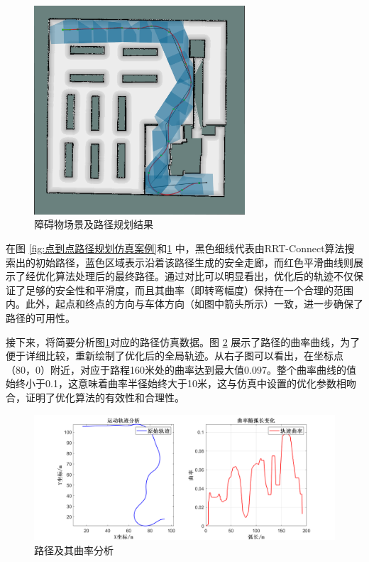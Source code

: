\documentclass[master,academic]{ysuthesis} %
\begin{document}
		\begin{figure}[H]
			\centering
			\includegraphics[width=0.7\textwidth]{single.png}
			\caption{障碍物场景及路径规划结果}
			\label{fig:single}
		\end{figure}
		
		在图 \ref{fig:点到点路径规划仿真案例}和\ref{fig:single} 中，黑色细线代表由RRT-Connect算法搜索出的初始路径，蓝色区域表示沿着该路径生成的安全走廊，而红色平滑曲线则展示了经优化算法处理后的最终路径。通过对比可以明显看出，优化后的轨迹不仅保证了足够的安全性和平滑度，而且其曲率（即转弯幅度）保持在一个合理的范围内。此外，起点和终点的方向与车体方向（如图中箭头所示）一致，进一步确保了路径的可用性。

		接下来，将简要分析图\ref{fig:single}对应的路径仿真数据。图 \ref{fig:datasingle} 展示了路径的曲率曲线，为了便于详细比较，重新绘制了优化后的全局轨迹。从右子图可以看出，在坐标点（80，0）附近，对应于路程160米处的曲率达到最大值0.097。整个曲率曲线的值始终小于0.1，这意味着曲率半径始终大于10米，这与仿真中设置的优化参数相吻合，证明了优化算法的有效性和合理性。

		\begin{figure}[H]
		\centering
		\includegraphics[width=1\textwidth]{datasingle.png}
		\caption{路径及其曲率分析}
		\label{fig:datasingle}
		\end{figure}
\end{document}
